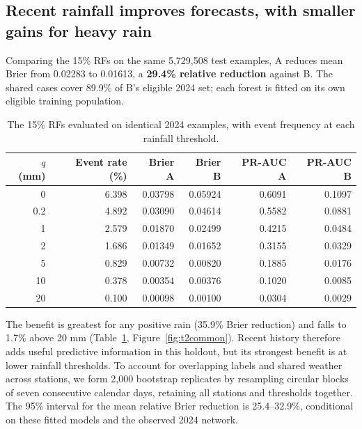 \subsection{Recent rainfall improves forecasts, with smaller gains for heavy rain}

Comparing the 15\% RFs on the same 5,729,508 test examples, A reduces mean Brier from 0.02283 to 0.01613, a \textbf{29.4\% relative reduction} against B. The shared cases cover 89.9\% of B's eligible 2024 set; each forest is fitted on its own eligible training population.
\par
\begin{table}[!ht]\centering\small
\begin{tabular}{rrrrrr}\toprule
$q$ (mm) & Event rate (\%) & Brier A & Brier B & PR-AUC A & PR-AUC B\\\midrule
0 & 6.398 & 0.03798 & 0.05924 & 0.6091 & 0.1097 \\
0.2 & 4.892 & 0.03090 & 0.04614 & 0.5582 & 0.0881 \\
1 & 2.579 & 0.01870 & 0.02499 & 0.4215 & 0.0484 \\
2 & 1.686 & 0.01349 & 0.01652 & 0.3155 & 0.0329 \\
5 & 0.829 & 0.00732 & 0.00820 & 0.1885 & 0.0176 \\
10 & 0.378 & 0.00354 & 0.00376 & 0.1020 & 0.0085 \\
20 & 0.100 & 0.00098 & 0.00100 & 0.0304 & 0.0029 \\
\bottomrule
\end{tabular}
\caption{The 15\% RFs evaluated on identical 2024 examples, with event frequency at each rainfall threshold.}\label{tab:t2common}
\end{table}
\par
The benefit is greatest for any positive rain (35.9\% Brier reduction) and falls to 1.7\% above 20 mm (Table~\ref{tab:t2common}, Figure~\ref{fig:t2common}). Recent history therefore adds useful predictive information in this holdout, but its strongest benefit is at lower rainfall thresholds.
To account for overlapping labels and shared weather across stations, we form 2,000 bootstrap replicates by resampling circular blocks of seven consecutive calendar days, retaining all stations and thresholds together. The 95\% interval for the mean relative Brier reduction is 25.4--32.9\%, conditional on these fitted models and the observed 2024 network.

